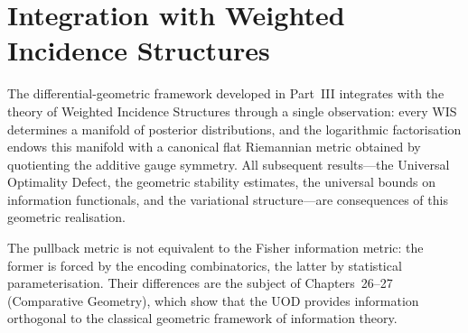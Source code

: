 \chapter[Integration with WIS]{Integration with Weighted Incidence Structures}

The differential-geometric framework developed in Part~III integrates
with the theory of Weighted Incidence Structures through a single
observation: every WIS determines a manifold of posterior distributions,
and the logarithmic factorisation endows this manifold with a canonical
flat Riemannian metric obtained by quotienting the additive gauge
symmetry.  All subsequent results---the Universal Optimality Defect, the
geometric stability estimates, the universal bounds on information
functionals, and the variational structure---are consequences of this
geometric realisation.

The pullback metric is not equivalent to the Fisher information metric:
the former is forced by the encoding combinatorics, the latter by
statistical parameterisation.  Their differences are the subject of
Chapters~26--27 (Comparative Geometry), which show that the UOD
provides information orthogonal to the classical geometric framework of
information theory.